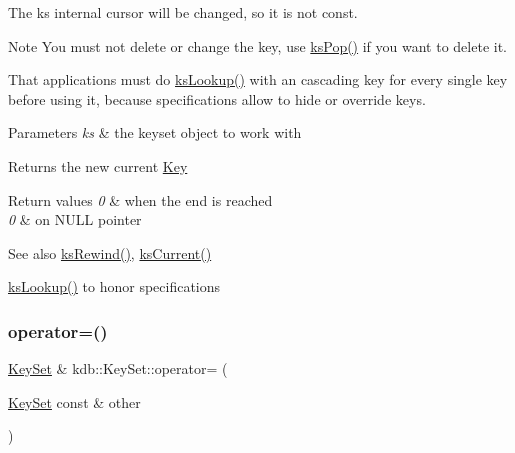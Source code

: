 The {\ttfamily ks} internal cursor will be changed, so it is not const.

\begin{DoxyNote}{Note}
You must not delete or change the key, use \hyperlink{group__keyset_gae42530b04defb772059de0600159cf69}{ks\+Pop()} if you want to delete it.

That applications must do \hyperlink{group__keyset_gaa34fc43a081e6b01e4120daa6c112004}{ks\+Lookup()} with an cascading key for every single key before using it, because specifications allow to hide or override keys.
\end{DoxyNote}

\begin{DoxyParams}{Parameters}
{\em ks} & the keyset object to work with \\
\hline
\end{DoxyParams}
\begin{DoxyReturn}{Returns}
the new current \hyperlink{classkdb_1_1Key}{Key} 
\end{DoxyReturn}

\begin{DoxyRetVals}{Return values}
{\em 0} & when the end is reached \\
\hline
{\em 0} & on N\+U\+LL pointer \\
\hline
\end{DoxyRetVals}
\begin{DoxySeeAlso}{See also}
\hyperlink{group__keyset_gabe793ff51f1728e3429c84a8a9086b70}{ks\+Rewind()}, \hyperlink{group__keyset_ga4287b9416912c5f2ab9c195cb74fb094}{ks\+Current()} 

\hyperlink{group__keyset_gaa34fc43a081e6b01e4120daa6c112004}{ks\+Lookup()} to honor specifications 
\end{DoxySeeAlso}
\mbox{\label{classkdb_1_1KeySet_a1c54736b7206bc2253d02a5bf4b3ccfb}} 
\subsubsection{\texorpdfstring{operator=()}{operator=()}}
{\footnotesize\ttfamily \hyperlink{classkdb_1_1KeySet}{Key\+Set} \& kdb\+::\+Key\+Set\+::operator= (\begin{DoxyParamCaption}\item[{\hyperlink{classkdb_1_1KeySet}{Key\+Set} const \&}]{other }\end{DoxyParamCaption})\hspace{0.3cm}{\ttfamily [inline]}}




